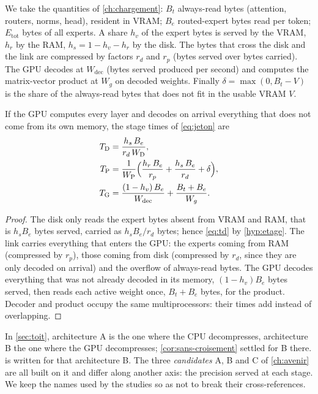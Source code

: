 We take the quantities of \cref{ch:chargement}: $B_t$ always-read bytes (attention, routers, norms, head), resident in VRAM; $B_e$ routed-expert bytes read per token; $E_{\mathrm{tot}}$ bytes of all experts. A share $h_v$ of the expert bytes is served by the VRAM, $h_r$ by the RAM, $h_s = 1 - h_v - h_r$ by the disk. The bytes that cross the disk and the link are compressed by factors $r_d$ and $r_p$ (bytes served over bytes carried). The GPU decodes at $W_{\mathrm{dec}}$ (bytes served produced per second) and computes the matrix-vector product at $W_g$ on decoded weights. Finally $\delta = \max(0, B_t - V)$ is the share of the always-read bytes that does not fit in the usable VRAM $V$.

\begin{proposition}\label{prop:termes}
If the GPU computes every layer and decodes on arrival everything that does not come from its own memory, the stage times of \cref{eq:jeton} are
\begin{align}
T_{\mathrm{D}} &= \frac{h_s\,B_e}{r_d\,W_{\mathrm{D}}}, \label{eq:td}\\
T_{\mathrm{P}} &= \frac{1}{W_{\mathrm{P}}}\Bigl(\frac{h_r\,B_e}{r_p} + \frac{h_s\,B_e}{r_d} + \delta\Bigr), \label{eq:tp}\\
T_{\mathrm{G}} &= \frac{(1-h_v)\,B_e}{W_{\mathrm{dec}}} + \frac{B_t + B_e}{W_g}. \label{eq:tg}
\end{align}
\end{proposition}

\begin{proof}
The disk only reads the expert bytes absent from VRAM and RAM, that is $h_s B_e$ bytes served, carried as $h_s B_e/r_d$ bytes; hence \cref{eq:td} by \cref{hyp:etage}. The link carries everything that enters the GPU: the experts coming from RAM (compressed by $r_p$), those coming from disk (compressed by $r_d$, since they are only decoded on arrival) and the overflow of always-read bytes. The GPU decodes everything that was not already decoded in its memory, $(1-h_v)B_e$ bytes served, then reads each active weight once, $B_t + B_e$ bytes, for the product. Decoder and product occupy the same multiprocessors: their times add instead of overlapping.
\end{proof}

\begin{remarque}
In \cref{sec:toit}, architecture A is the one where the CPU decompresses, architecture B the one where the GPU decompresses; \cref{cor:sans-croisement} settled for B there.  is written for that architecture B. The three \emph{candidates} A, B and C of \cref{ch:avenir} are all built on it and differ along another axis: the precision served at each stage. We keep the names used by the studies so as not to break their cross-references.
\end{remarque}

